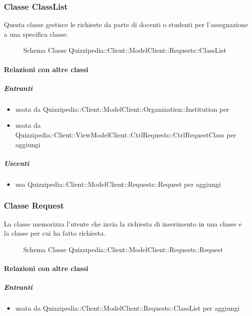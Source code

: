 \subsubsection{Classe ClassList}
Questa classe gestisce le richieste da parte di docenti o studenti per l'assegnazione a una specifica classe.
\begin{figure}[H]
\centering
\noindent{}
\caption[Schema Classe ClassList]{Schema Classe Quizzipedia::Client::ModelClient::Requests::ClassList}
\end{figure}
\paragraph{Relazioni con altre classi}
\subparagraph{Entranti}
\begin{itemize}
\item usata da Quizzipedia::Client::ModelClient::Organization::Institution per 
\item usata da Quizzipedia::Client::ViewModelClient::CtrlRequests::CtrlRequestClass per aggiungi
\end{itemize}
\subparagraph{Uscenti}
\begin{itemize}
\item usa Quizzipedia::Client::ModelClient::Requests::Request per aggiungi
\end{itemize}
\subsubsection{Classe Request}
La classe memorizza l'utente che invia la richiesta di inserimento in una classe e la classe per cui ha fatto richiesta.
\begin{figure}[H]
\centering
\noindent{}
\caption[Schema Classe Request]{Schema Classe Quizzipedia::Client::ModelClient::Requests::Request}
\end{figure}
\paragraph{Relazioni con altre classi}
\subparagraph{Entranti}
\begin{itemize}
\item usata da Quizzipedia::Client::ModelClient::Requests::ClassList per aggiungi
\end{itemize}
